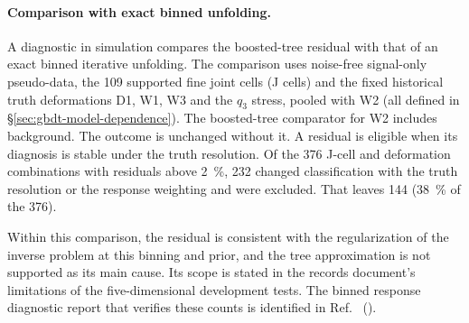 \paragraph{Comparison with exact binned unfolding.} A diagnostic in simulation compares the boosted-tree residual with that of an exact binned iterative unfolding. The comparison uses noise-free signal-only pseudo-data, the 109 supported fine joint cells (J cells) and the fixed historical truth deformations D1, W1, W3 and the $q_3$ stress, pooled with W2 (all defined in \S\ref{sec:gbdt-model-dependence}). The boosted-tree comparator for W2 includes background. The outcome is unchanged without it. A residual is eligible when its diagnosis is stable under the truth resolution. Of the 376 J-cell and deformation combinations with residuals above \SI{2}{\percent}, 232 changed classification with the truth resolution or the response weighting and were excluded. That leaves 144 (\SI{38}{\percent} of the 376).

Within this comparison, the residual is consistent with the regularization of the inverse problem at this binning and prior, and the tree approximation is not supported as its main cause. Its scope is stated in the records document's limitations of the five-dimensional development tests. The binned response diagnostic report that verifies these counts is identified in Ref.~\cite{NoteRecords2026} ().

